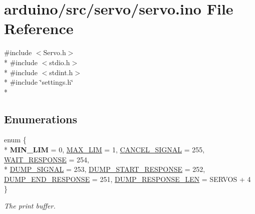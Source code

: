 \hypertarget{servo_8ino}{}\section{arduino/src/servo/servo.ino File Reference}
\label{servo_8ino}
{\ttfamily \#include $<$Servo.\+h$>$}\\*
{\ttfamily \#include $<$stdio.\+h$>$}\\*
{\ttfamily \#include $<$stdint.\+h$>$}\\*
{\ttfamily \#include \char`\"{}settings.\+h\char`\"{}}\\*
\subsection*{Enumerations}
\begin{DoxyCompactItemize}
\item 
enum \{ \\*
{\bfseries M\+I\+N\+\_\+\+L\+I\+M} = 0, 
\hyperlink{servo_8ino_a99fb83031ce9923c84392b4e92f956b5a28384d7634c7976556d681b53a81e140}{M\+A\+X\+\_\+\+L\+I\+M} = 1, 
\hyperlink{servo_8ino_a99fb83031ce9923c84392b4e92f956b5ac997ff2715ad695454398a53eeed31cc}{C\+A\+N\+C\+E\+L\+\_\+\+S\+I\+G\+N\+A\+L} = 255, 
\hyperlink{servo_8ino_a99fb83031ce9923c84392b4e92f956b5ac22157b3832ba05308923fb860925d68}{W\+A\+I\+T\+\_\+\+R\+E\+S\+P\+O\+N\+S\+E} = 254, 
\\*
\hyperlink{servo_8ino_a99fb83031ce9923c84392b4e92f956b5a31cd671c80d04a4acc2d8256ec960c90}{D\+U\+M\+P\+\_\+\+S\+I\+G\+N\+A\+L} = 253, 
\hyperlink{servo_8ino_a99fb83031ce9923c84392b4e92f956b5a51975080564db9aa29bff29cce328b5f}{D\+U\+M\+P\+\_\+\+S\+T\+A\+R\+T\+\_\+\+R\+E\+S\+P\+O\+N\+S\+E} = 252, 
\hyperlink{servo_8ino_a99fb83031ce9923c84392b4e92f956b5aa7ca295335eb71b345d3b0bd0e53277e}{D\+U\+M\+P\+\_\+\+E\+N\+D\+\_\+\+R\+E\+S\+P\+O\+N\+S\+E} = 251, 
\hyperlink{servo_8ino_a99fb83031ce9923c84392b4e92f956b5aebe1616f434c26e10f088aebf559d708}{D\+U\+M\+P\+\_\+\+R\+E\+S\+P\+O\+N\+S\+E\+\_\+\+L\+E\+N} = S\+E\+R\+V\+O\+S + 4
 \}
\begin{DoxyCompactList}\small\item\em The print buffer. \end{DoxyCompactList}\end{DoxyCompactItemize}
